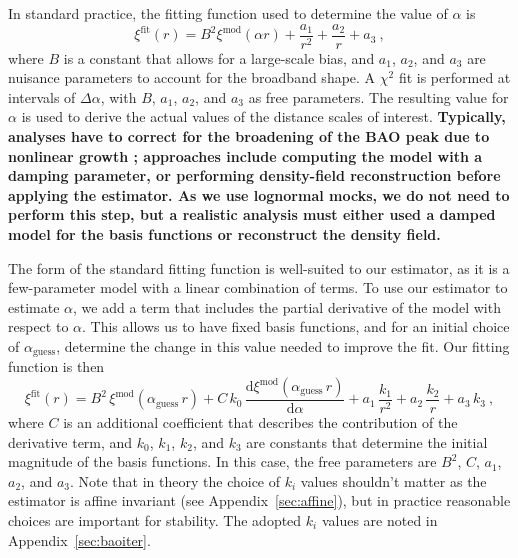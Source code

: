 \documentclass[modern]{aastex62}
\newcommand{\dd}{\mathrm{d}}
\newcommand{\new}[1]{\textbf{#1}}
\begin{document}
In standard practice, the fitting function used to determine the value of $\alpha$ is 
\begin{equation}
\xi^{\mathrm{fit}}(r) = B^2 \xi^{\mathrm{mod}}(\alpha r) + \frac{a_1}{r^2} + \frac{a_2}{r} + a_3 ~,
\end{equation}
where $B$ is a constant that allows for a large-scale bias, and $a_1$, $a_2$, and $a_3$ are nuisance parameters to account for the broadband shape.
A $\chi^2$ fit is performed at intervals of $\Delta \alpha$, with $B$, $a_1$, $a_2$, and $a_3$ as free parameters. 
The resulting value for $\alpha$ is used to derive the actual values of the distance scales of interest.
\new{Typically, analyses have to correct for the broadening of the BAO peak due to nonlinear growth \citep{Eisenstein2007}; approaches include computing the model with a damping parameter, or performing density-field reconstruction before applying the estimator.
As we use lognormal mocks, we do not need to perform this step, but a realistic analysis must either used a damped model for the basis functions or reconstruct the density field.}

The form of the standard fitting function is well-suited to our estimator, as it is a few-parameter model with a linear combination of terms.
To use our estimator to estimate $\alpha$, we add a term that includes the partial derivative of the model with respect to $\alpha$.
This allows us to have fixed basis functions, and for an initial choice of $\alpha_\mathrm{guess}$, determine the change in this value needed to improve the fit. 
Our fitting function is then
\begin{equation} \label{eq:baoiter_fit}
\xi^\mathrm{fit}(r) = B^2\,\xi^\mathrm{mod}(\alpha_\mathrm{guess}\,r) + C\,k_0\,\frac{\dd \xi^\mathrm{mod}(\alpha_\mathrm{guess}\,r)}{\dd \alpha} + a_1\,\frac{k_1}{r^2} + a_2\,\frac{k_2}{r} + a_3\,k_3 ~,
\end{equation}
where $C$ is an additional coefficient that describes the contribution of the derivative term, and $k_0$, $k_1$, $k_2$, and $k_3$ are constants that determine the initial magnitude of the basis functions.
In this case, the free parameters are $B^2$, $C$, $a_1$, $a_2$, and $a_3$.
Note that in theory the choice of $k_i$ values shouldn't matter as the estimator is affine invariant (see Appendix~\ref{sec:affine}), but in practice reasonable choices are important for stability.
The adopted $k_i$ values are noted in Appendix~\ref{sec:baoiter}.
\end{document}
